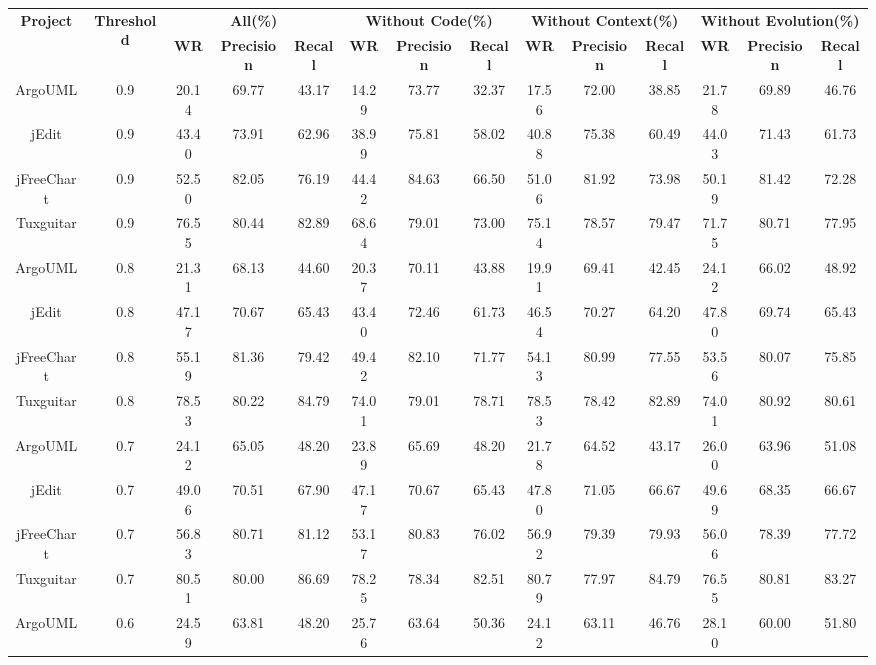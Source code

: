 {\begin{table}[htbp]
\vspace{0.5em}\centering\wuhao
\begin{tabular}{cccccccccccccc}
\toprule[1.5pt]
\multirow{2}{*}{\textbf{Project}}&\multirow{2}{*}{\textbf{Threshold}}&\multicolumn{3}{|c|}{\textbf{All(\%)}}&\multicolumn{3}{|c|}{\textbf{Without Code(\%)}}&\multicolumn{3}{|c|}{\textbf{Without Context(\%)}}&\multicolumn{3}{|c|}{\textbf{Without Evolution(\%)}}\\
\cline{3-14}
&&\textbf{WR}&\textbf{Precision}&\textbf{Recall}&\textbf{WR}&\textbf{Precision}&\textbf{Recall}&\textbf{WR}&\textbf{Precision}&\textbf{Recall}&\textbf{WR}&\textbf{Precision}&\textbf{Recall}\\
\midrule[1pt]
ArgoUML&0.9&20.14&	69.77&	43.17&14.29&	73.77&	32.37&17.56&	72.00&	38.85&21.78&	69.89&	46.76\\
jEdit&0.9&	43.40&	73.91&	62.96&	38.99&	75.81&	58.02&	40.88&	75.38&	60.49&	44.03&	71.43&	61.73\\
jFreeChart&0.9&	52.50&	82.05&	76.19&	44.42&	84.63&	66.50&	51.06&	81.92&	73.98&	50.19&	81.42&	72.28\\
Tuxguitar&0.9&	76.55&	80.44&	82.89&	68.64&	79.01&	73.00&	75.14&	78.57&	79.47&	71.75&	80.71&	77.95\\
ArgoUML&0.8&	21.31&	68.13&	44.60&	20.37&	70.11&	43.88&	19.91&	69.41&	42.45&	24.12&	66.02&	48.92\\
jEdit&0.8&	47.17&	70.67&	65.43&	43.40&	72.46&	61.73&	46.54&	70.27&	64.20&	47.80&	69.74&	65.43\\
jFreeChart&0.8&	55.19&	81.36&	79.42&	49.42&	82.10&	71.77&	54.13&	80.99&	77.55&	53.56&	80.07&	75.85\\
Tuxguitar&0.8&	78.53&	80.22&	84.79&	74.01&	79.01&	78.71&	78.53&	78.42&	82.89&	74.01&	80.92&	80.61\\
ArgoUML&0.7&	24.12&	65.05&	48.20&	23.89&	65.69&	48.20&	21.78&	64.52&	43.17&	26.00&	63.96&	51.08\\
jEdit&0.7&	49.06&	70.51&	67.90&	47.17&	70.67&	65.43&	47.80&	71.05&	66.67&	49.69&	68.35&	66.67\\
jFreeChart&0.7&	56.83&	80.71&	81.12&	53.17&	80.83&	76.02&	56.92&	79.39&	79.93&	56.06&	78.39&	77.72\\
Tuxguitar&0.7&	80.51&	80.00&	86.69&	78.25&	78.34&	82.51&	80.79&	77.97&	84.79&	76.55&	80.81&	83.27\\
ArgoUML&0.6&	24.59&	63.81&	48.20&	25.76&	63.64&	50.36&	24.12&	63.11&	46.76&	28.10&	60.00&	51.80\\

\end{tabular}
\end{table}}
